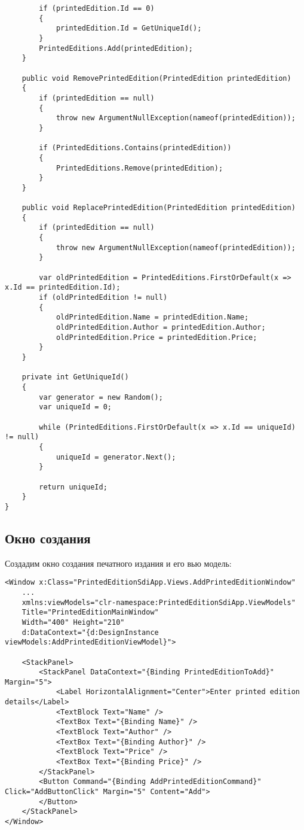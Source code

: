 \documentclass[a4paper,14pt]{extarticle}
\begin{document}
\begin{lstlisting}
        if (printedEdition.Id == 0)
        {
            printedEdition.Id = GetUniqueId();
        }
        PrintedEditions.Add(printedEdition);
    }

    public void RemovePrintedEdition(PrintedEdition printedEdition)
    {
        if (printedEdition == null)
        {
            throw new ArgumentNullException(nameof(printedEdition));
        }

        if (PrintedEditions.Contains(printedEdition))
        {
            PrintedEditions.Remove(printedEdition);
        }
    }

    public void ReplacePrintedEdition(PrintedEdition printedEdition)
    {
        if (printedEdition == null)
        {
            throw new ArgumentNullException(nameof(printedEdition));
        }

        var oldPrintedEdition = PrintedEditions.FirstOrDefault(x => x.Id == printedEdition.Id);
        if (oldPrintedEdition != null)
        {
            oldPrintedEdition.Name = printedEdition.Name;
            oldPrintedEdition.Author = printedEdition.Author;
            oldPrintedEdition.Price = printedEdition.Price;
        }
    }

    private int GetUniqueId()
    {
        var generator = new Random();
        var uniqueId = 0;

        while (PrintedEditions.FirstOrDefault(x => x.Id == uniqueId) != null)
        {
            uniqueId = generator.Next();
        }

        return uniqueId;
    }
}
\end{lstlisting}

\subsection{Окно создания}
Создадим окно создания печатного издания и его вью модель:
\begin{lstlisting}
<Window x:Class="PrintedEditionSdiApp.Views.AddPrintedEditionWindow"
    ...
    xmlns:viewModels="clr-namespace:PrintedEditionSdiApp.ViewModels"
    Title="PrintedEditionMainWindow"
    Width="400" Height="210"
    d:DataContext="{d:DesignInstance viewModels:AddPrintedEditionViewModel}">

    <StackPanel>
        <StackPanel DataContext="{Binding PrintedEditionToAdd}" Margin="5">
            <Label HorizontalAlignment="Center">Enter printed edition details</Label>
            <TextBlock Text="Name" />
            <TextBox Text="{Binding Name}" />
            <TextBlock Text="Author" />
            <TextBox Text="{Binding Author}" />
            <TextBlock Text="Price" />
            <TextBox Text="{Binding Price}" />
        </StackPanel>
        <Button Command="{Binding AddPrintedEditionCommand}" Click="AddButtonClick" Margin="5" Content="Add">
        </Button>
    </StackPanel>
</Window>
\end{lstlisting}
\end{document}
